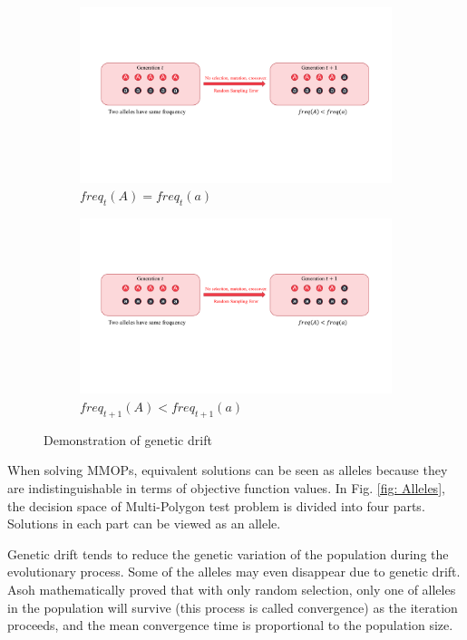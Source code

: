 \documentclass[conference]{IEEEtran}
\begin{document}
\begin{figure}[htbp]
	\centering
	\begin{subfigure}[b]{.24\textwidth}
		\includegraphics[width=\linewidth]{Section2/Generation_t}
		\caption{$freq_t(A) = freq_t(a)$}
	\end{subfigure}
	\begin{subfigure}[b]{.24\textwidth}
		\includegraphics[width=\linewidth]{Section2/Generation_t1}
		\caption{$freq_{t+1}(A) < freq_{t+1}(a)$}
	\end{subfigure}
	\caption{Demonstration of genetic drift}
	\label{fig:Genetic drift demo}
\end{figure}

When solving MMOPs, equivalent solutions can be seen as alleles because they are indistinguishable in terms of objective function values. In Fig. \ref{fig: Alleles}, the decision space of Multi-Polygon test problem is divided into four parts. Solutions in each part can be viewed as an allele.

Genetic drift tends to reduce the genetic variation of the population during the evolutionary process. Some of the alleles may even disappear due to genetic drift. Asoh\cite{asoh1994mean} mathematically proved that with only random selection, only one of alleles in the population will survive (this process is called convergence) as the iteration proceeds, and the mean convergence time is proportional to the population size. 
\end{document}
